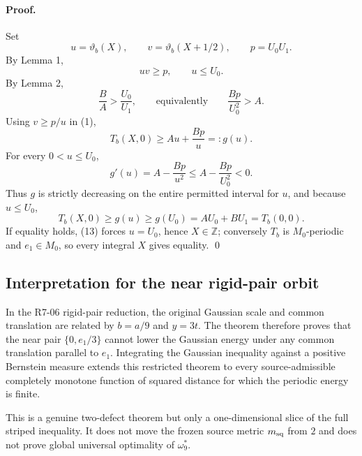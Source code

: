 \paragraph{Proof.}
Set
\[
 u=\vartheta_b(X),\qquad v=\vartheta_b(X+1/2),\qquad p=U_0U_1.
\]
By Lemma 1,
\[
 uv\ge p,\qquad u\le U_0.\tag{10}
\]
By Lemma 2,
\[
 \frac BA>\frac{U_0}{U_1},\qquad\text{equivalently}\qquad
 \frac{Bp}{U_0^2}>A.\tag{11}
\]
Using $v\ge p/u$ in (1),
\[
 T_b(X,0)\ge Au+\frac{Bp}{u}=:g(u).\tag{12}
\]
For every $0<u\le U_0$,
\[
 g'(u)=A-\frac{Bp}{u^2}
 \le A-\frac{Bp}{U_0^2}<0.\tag{13}
\]
Thus $g$ is strictly decreasing on the entire permitted interval for $u$, and
because $u\le U_0$,
\[
 T_b(X,0)\ge g(u)\ge g(U_0)
 =AU_0+BU_1=T_b(0,0).
\]
If equality holds, (13) forces $u=U_0$, hence $X\in\mathbb Z$; conversely
$T_b$ is $M_0$-periodic and $e_1\in M_0$, so every integral $X$ gives equality.
\qed

\subsection*{Interpretation for the near rigid-pair orbit}
In the R7-06 rigid-pair reduction, the original Gaussian scale and common
translation are related by $b=a/9$ and $y=3t$.  The theorem therefore proves
that the near pair $\{0,e_1/3\}$ cannot lower the Gaussian energy under any
common translation parallel to $e_1$.  Integrating the Gaussian inequality
against a positive Bernstein measure extends this restricted theorem to every
source-admissible completely monotone function of squared distance for which
the periodic energy is finite.

This is a genuine two-defect theorem but only a one-dimensional slice of the
full striped inequality.  It does not move the frozen source metric $m_{\rm sq}$
from $2$ and does not prove global universal optimality of $\omega^*_9$.
